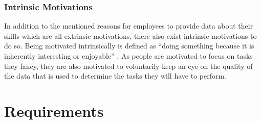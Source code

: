 \newpage
\subsubsection{Intrinsic Motivations}
In addition to the mentioned reasons for employees to provide data about their skills which are all extrinsic motivations,
there also exist intrinsic motivations to do so. Being motivated intrinsically is defined as ``doing something because it is inherently interesting or enjoyable'' \cite{RYAN200054}. As people are motivated to focus on tasks they fancy, they are also motivated to voluntarily keep an eye on the quality of the data that is used to determine the tasks they will have to perform.


\section{Requirements}
\label{requirements}
